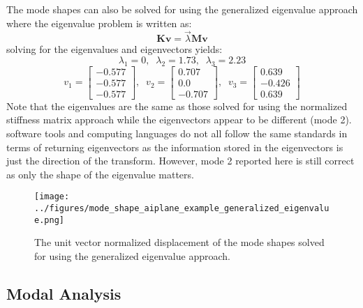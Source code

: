 \documentclass[12pt,letter]{article}
\begin{document}
\begin{example}
	\noindent The mode shapes can also be solved for using the generalized eigenvalue approach where the eigenvalue problem is written as:
	\begin{equation}
	\textbf{K}\textbf{v} = \vec{\lambda}\textbf{M}\textbf{v}
	\end{equation}
	solving for the eigenvalues and eigenvectors yields:
	\begin{equation}
	\lambda_1 = 0, \; \; \lambda_2 = 1.73, \; \; \lambda_3 = 2.23
	\end{equation}
	\begin{equation}
	v_1 = \begin{bmatrix} -0.577 \\    -0.577 \\   -0.577  \end{bmatrix}, \; \; v_2 = \begin{bmatrix} 0.707 \\    0.0 \\    -0.707 \end{bmatrix}, \; \; v_3 = \begin{bmatrix} 0.639 \\    -0.426 \\    0.639 \end{bmatrix}
	\end{equation}
	Note that the eigenvalues are the same as those solved for using the normalized stiffness matrix approach while the eigenvectors appear to be different (mode 2). software tools and computing languages do not all follow the same standards in terms of returning eigenvectors as the information stored in the eigenvectors is just the direction of the transform. However, mode 2 reported here is still correct as only the shape of the eigenvalue matters.
	
	\begin{figure}[H]
		\centering
		\texttt{[image: ../figures/mode\_shape\_aiplane\_example\_generalized\_eigenvalue.png]}
		\caption{The unit vector normalized displacement of the mode shapes solved for using the generalized eigenvalue approach.}
		\label{fig:mode_shape_aiplane_example_generalized_eigenvalue}
	\end{figure}

	\end{example}
	
	
	
	
	\subsection{Modal Analysis}
	
\end{document}
